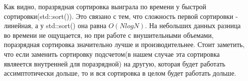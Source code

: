 Как видно, поразрядная сортировка выиграла по времени у быстрой сортировки(std::sort()). Это связано с тем, что сложность первой сортировки - линейная, а у std::sort() она равна $O(NlogN)$. На небольших данных разница во времени не ощущается, но при работе с внушительными объемами, поразрядная сортировка значительно лучше и производительнее. Стоит заметить, что если заменить сортировку подсчетом(в нашем случае эта сортировка являеется внутренней для поразрядной) на другую, которая будет работать ассимптотически дольше, то и вся сортировка в целом будет работать дольше. 

\pagebreak
